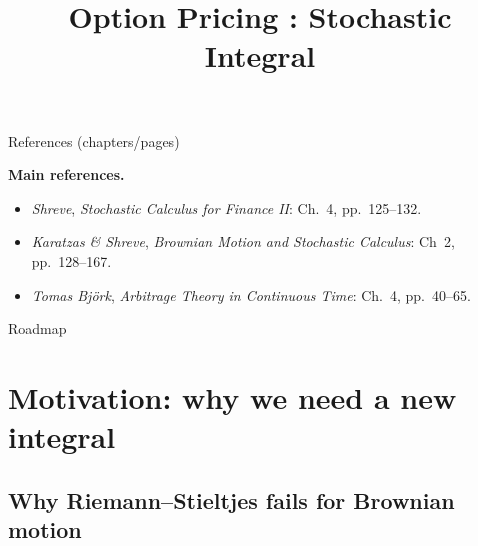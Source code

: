 \documentclass[10pt,aspectratio=169]{beamer}
\title{Option Pricing : Stochastic Integral}
\author{}
\date{}
\begin{document}
\begin{frame}
  \titlepage
\end{frame}

\begin{frame}{References (chapters/pages)}

\footnotesize
\textbf{Main references.}
\begin{itemize}\setlength{\itemsep}{0.35em}
  \item \textit{Shreve}, \emph{Stochastic Calculus for Finance II}:
  Ch.~4, pp.~125--132.
  \item \textit{Karatzas \& Shreve}, \emph{Brownian Motion
and Stochastic Calculus}:
  Ch~2, pp.~128--167.
  \item \textit{Tomas Bj\"ork}, \emph{Arbitrage Theory in Continuous Time}:
  Ch.~4, pp.~40--65.
\end{itemize}
\end{frame}
\begin{frame}{Roadmap}
  \tableofcontents[hideallsubsections]
\end{frame}

\section{Motivation: why we need a new integral}

\subsection{Why Riemann--Stieltjes fails for Brownian motion}
\end{document}
